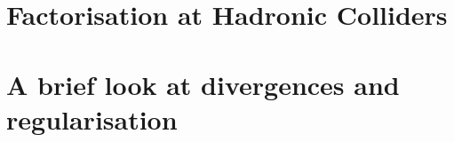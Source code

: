 \section{Factorisation at Hadronic Colliders}

\section{A brief look at divergences and regularisation}







